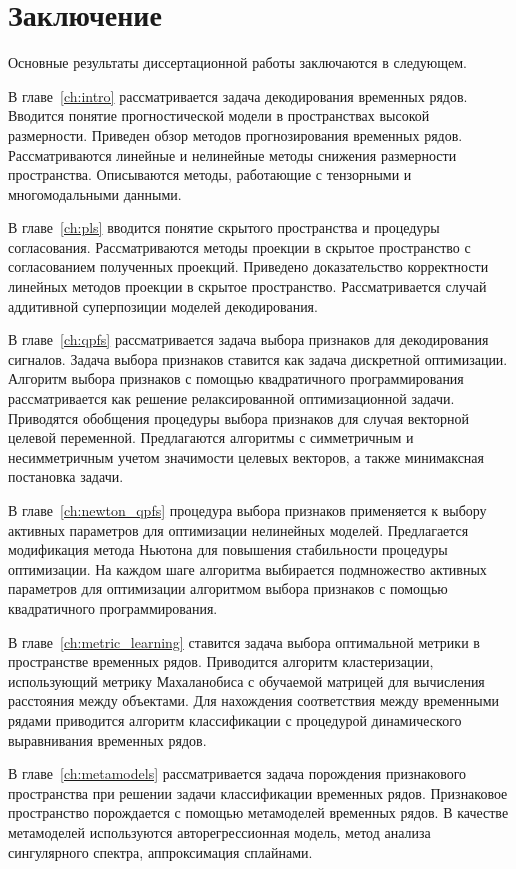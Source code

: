\chapter*{Заключение}

Основные результаты диссертационной работы заключаются в следующем.

В главе~\ref{ch:intro} рассматривается задача декодирования временных рядов.
Вводится понятие прогностической модели в пространствах высокой размерности.
Приведен обзор методов прогнозирования временных рядов.
Рассматриваются линейные и нелинейные методы снижения размерности пространства.
Описываются методы, работающие с тензорными и многомодальными данными.

В главе~\ref{ch:pls} вводится понятие скрытого пространства и процедуры согласования.
Рассматриваются методы проекции в скрытое пространство с согласованием полученных проекций.
Приведено доказательство корректности линейных методов проекции в скрытое пространство.
Рассматривается случай аддитивной суперпозиции моделей декодирования.

В главе~\ref{ch:qpfs} рассматривается задача выбора признаков для декодирования сигналов.
Задача выбора признаков ставится как задача дискретной оптимизации. 
Алгоритм выбора признаков с помощью квадратичного программирования рассматривается как решение релаксированной оптимизационной задачи.
Приводятся обобщения процедуры выбора признаков для случая векторной целевой переменной.
Предлагаются алгоритмы с симметричным и несимметричным учетом значимости целевых векторов, а также минимаксная постановка задачи.

В главе~\ref{ch:newton_qpfs} процедура выбора признаков применяется к выбору активных параметров для оптимизации нелинейных моделей.
Предлагается модификация метода Ньютона для повышения стабильности процедуры оптимизации.
На каждом шаге алгоритма выбирается подмножество активных параметров для оптимизации алгоритмом выбора признаков с помощью квадратичного программирования.

В главе~\ref{ch:metric_learning} ставится задача выбора оптимальной метрики в пространстве временных рядов.
Приводится алгоритм кластеризации, использующий метрику Махаланобиса с обучаемой матрицей для вычисления расстояния между объектами. 
Для нахождения соответствия между временными рядами приводится алгоритм классификации с процедурой динамического выравнивания временных рядов.

В главе~\ref{ch:metamodels} рассматривается задача порождения признакового пространства при решении задачи классификации временных рядов.
Признаковое пространство порождается с помощью метамоделей временных рядов.
В качестве метамоделей используются авторегрессионная модель, метод анализа сингулярного спектра, аппроксимация сплайнами.
